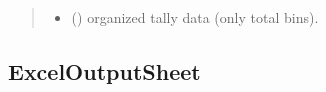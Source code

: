 \documentclass[letterpaper,10pt,english]{sphinxmanual}
\begin{document}
\begin{fulllineitems}
\begin{fulllineitems}
\begin{quote}
\begin{description}
\begin{itemize}
\item {} 
\sphinxAtStartPar
{} () \textendash{} organized tally data (only total bins).

\end{itemize}


\end{description}\end{quote}

\end{fulllineitems}


\end{fulllineitems}



\subsection{ExcelOutputSheet}
\label{\detokenize{api/postprocessing:exceloutputsheet}}
\end{document}
